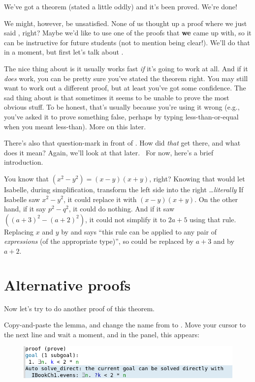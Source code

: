 We've got a theorem (stated a little oddly) and it's been proved. We're done! 

We might, however, be unsatisfied. None of us thought up a proof where we just said , right? Maybe we'd like to use one of the proofs that \textbf{we} came up with, so it can be instructive for future students (not to mention being clear!). We'll do that in a moment, but first let's talk about .

The nice thing about  is it usually works fast \textit{if} it's going to work at all. And if it \textit{does} work, you can be pretty sure you've stated the theorem right. You may still want to work out a different proof, but at least you've got some confidence. The sad thing about  is that sometimes it seems to be unable to prove the most obvious stuff. To be honest, that's usually because you're using it wrong (e.g., you've asked it to prove something false, perhaps by typing less-than-or-equal when you meant less-than). More on this later. 

There's also that question-mark in front of . How did \textit{that} get there, and what does it mean? Again, we'll look at that later.  For now, here's a brief introduction.

You know that $(x^2 - y^2) = (x-y)(x+y)$, right? Knowing that would let Isabelle, during simplification, transform the left side into the right \ldots \textit{literally}  If Isabelle saw $x^2 - y^2$, it could replace it with $(x-y)(x+y)$. On the other hand, if it say $p^2 - q^2$, it could do nothing. And if it saw $((a+3)^2 - (a+2)^2)$, it could not simplify it to $2a + 5$ using that rule. 
Replacing $x$ and $y$ by  and  says ``this rule can be applied to any pair of \textit{expressions} (of the appropriate type)'', so  could be replaced by $a+3$ and  by $a+2$.

\section{Alternative proofs}
Now let's try to do another proof of this theorem. 

\task Copy-and-paste the lemma, and change the name from  to . Move your cursor to the next line and wait a moment, and in the  panel, this appears:

\begin{figure}[h]
    \includegraphics[width=1\linewidth]{TEXT/C01/Images/auto-proof.png}
\end{figure}


